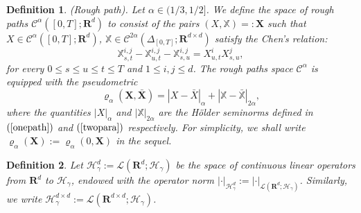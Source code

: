 \documentclass[10pt,a4paper]{article}
\newtheorem{definition}{Definition}[section]
\numberwithin{equation}{section}
\begin{document}
\begin{definition}\label{RP}
	(\textit{Rough path}).
	Let $\alpha \in (1/3, 1/2]$.
	We define the space of rough paths $\mathscr{C}^{\alpha}([0,T];\mathbf{R}^d)$ to consist of the pairs $(X,\mathbb{X}) =: \mathbf{X}$
	such that $X \in \mathcal{C}^\alpha ([0,T];\mathbf{R}^d)$, $\mathbb{X} \in \mathcal{C}^{2\alpha}(\Delta_{[0,T]};\mathbf{R}^{d \times d})$ satisfy the Chen's relation:	
\begin{equation*}
 \mathbb{X}_{s,t}^{i,j} - \mathbb{X}_{u,t}^{i,j} - \mathbb{X}_{s,u}^{i,j} = X_{u,t}^{i}  X_{s,u}^{j},
\end{equation*}
	for every $0\leq s \leq u \leq t \leq T$ and $1 \leq i,j \leq d $.
	The rough paths space $\mathscr{C}^{\alpha}$ is equipped with the pseudometric
\begin{equation*}
	\varrho_{\alpha}(\mathbf{X},\bar{\mathbf{X}}) = |X - \bar{X}|_{\alpha} + |\mathbb{X} - \bar{\mathbb{X}}|_{2\alpha},	
\end{equation*}
where the quantities $|X|_{\alpha}$ and $|\mathbb{X}|_{2\alpha}$ are the H\"{o}lder seminorms defined in $(\ref{onepath})$ and $(\ref{twopara})$ respectively.
For simplicity, we shall write $\varrho_{\alpha}(\mathbf{X}) := \varrho_{\alpha}(0,\mathbf{X})$ in the sequel.
\end{definition}










\begin{definition}
Let $\mathcal{H}_\gamma^d :=\mathcal L(\mathbf{R}^d; \mathcal{H}_{\gamma})$ be the space of continuous linear operators from $\mathbf{R}^d$ to $\mathcal{H}_{\gamma}$, endowed with the operator norm $|\cdot|_{\mathcal{H}_{\gamma}^{d}}:=|\cdot|_{\mathcal L(\mathbf{R}^d; \mathcal{H}_{\gamma})}$.
Similarly, we write $\mathcal{H}_\gamma^{d \times d}:=\mathcal L(\mathbf{R}^{d \times d}; \mathcal{H}_{\gamma})$.
\end{definition}
\end{document}
